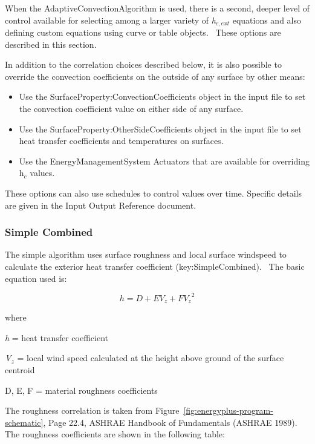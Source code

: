 When the AdaptiveConvectionAlgorithm is used, there is a second, deeper level of control available for selecting among a larger variety of \emph{h\(_{c,ext}\)} equations and also defining custom equations using curve or table objects.~ These options are described in this section.

In addition to the correlation choices described below, it is also possible to override the convection coefficients on the outside of any surface by other means:

\begin{itemize}
\item
  Use the SurfaceProperty:ConvectionCoefficients object in the input file to set the convection coefficient value on either side of any surface.
\item
  Use the SurfaceProperty:OtherSideCoefficients object in the input file to set heat transfer coefficients and temperatures on surfaces.
\item
  Use the EnergyManagementSystem Actuators that are available for overriding h\(_{c}\) values.
\end{itemize}

These options can also use schedules to control values over time. Specific details are given in the Input Output Reference document.

\subsubsection{Simple Combined}\label{simple-combined}

The simple algorithm uses surface roughness and local surface windspeed to calculate the exterior heat transfer coefficient (key:SimpleCombined).~ The basic equation used is:

\begin{equation}
h = D + E{V_z} + F{V_z}^2
\end{equation}

where

\emph{h} = heat transfer coefficient

\emph{V\(_{z}\)} = local wind speed calculated at the height above ground of the surface centroid

D, E, F = material roughness coefficients

The roughness correlation is taken from Figure~\ref{fig:energyplus-program-schematic}, Page 22.4, ASHRAE Handbook of Fundamentals (ASHRAE 1989).~ The roughness coefficients are shown in the following table:

